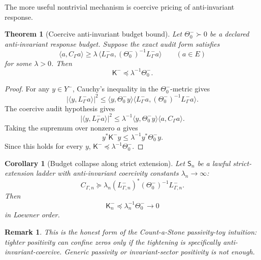 \documentclass[11pt]{article}
\newtheorem{theorem}{Theorem}
\newtheorem{corollary}{Corollary}
\newtheorem{remark}{Remark}
\newcommand{\K}{\mathsf K}
\newcommand{\pre}{\preceq}
\newcommand{\suc}{\succeq}
\begin{document}
The more useful nontrivial mechanism is coercive pricing of anti-invariant response.

\begin{theorem}[Coercive anti-invariant budget bound]
Let \(\Theta_0^-\succ 0\) be a declared anti-invariant response budget. Suppose the exact audit form satisfies
\begin{equation}
\boxed{
  \langle a,C_\Gamma a\rangle
  \ge
  \lambda\,\langle L^-_\Gamma a,
  (\Theta_0^-)^{-1}L^-_\Gamma a\rangle
  \qquad (a\in E)
}
\end{equation}
for some \(\lambda>0\). Then
\begin{equation}
\boxed{
  \K^-\pre \lambda^{-1}\Theta_0^- .
}
\end{equation}
\end{theorem}

\begin{proof}
For any \(y\in Y^-\), Cauchy's inequality in the \(\Theta_0^-\)-metric gives
\begin{equation}
|\langle y,L^-_\Gamma a\rangle|^2
\le
\langle y,\Theta_0^-y\rangle
\langle L^-_\Gamma a,(\Theta_0^-)^{-1}L^-_\Gamma a\rangle.
\end{equation}
The coercive audit hypothesis gives
\begin{equation}
|\langle y,L^-_\Gamma a\rangle|^2
\le
\lambda^{-1}\langle y,\Theta_0^-y\rangle\langle a,C_\Gamma a\rangle.
\end{equation}
Taking the supremum over nonzero \(a\) gives
\begin{equation}
  y^*\K^- y\le \lambda^{-1}y^*\Theta_0^-y.
\end{equation}
Since this holds for every \(y\), \(\K^-\pre\lambda^{-1}\Theta_0^-\).\end{proof}

\begin{corollary}[Budget collapse along strict extension]
Let \(\mathsf S_n\) be a lawful strict-extension ladder with anti-invariant coercivity constants \(\lambda_n\to\infty\):
\begin{equation}
  C_{\Gamma,n}\suc \lambda_n (L^-_{\Gamma,n})^*(\Theta_0^-)^{-1}L^-_{\Gamma,n}.
\end{equation}
Then
\begin{equation}
  \K_n^-\pre \lambda_n^{-1}\Theta_0^-\to0
\end{equation}
 in Loewner order.
\end{corollary}

\begin{remark}
This is the honest form of the Count-a-Stone passivity-toy intuition: tighter positivity can confine zeros only if the tightening is specifically anti-invariant-coercive. Generic passivity or invariant-sector positivity is not enough.
\end{remark}
\end{document}
